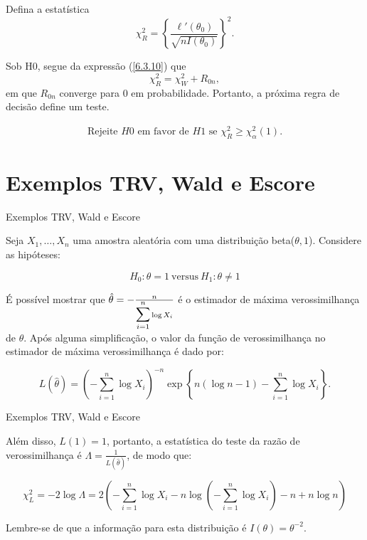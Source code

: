 \documentclass[12pt]{beamer}
\begin{document}
\begin{frame}{}
\begin{block}{}
\justifying
Defina a estatística
\[
\chi^2_R = \left\{\frac{\ell'(\theta_{0})}{\sqrt{nI(\theta_0)}}\right\}^2. 
\]

Sob H0, segue da expressão (\ref{6.3.10}) que
\[
\chi^2_R = \chi^2_W + R_{0n},
\]
em que $R_{0n}$ converge para $0$ em probabilidade. Portanto, a próxima regra de decisão define um teste.
\end{block}
\pause
\begin{block}{}
\justifying
\begin{align}\label{6.3.20}
    \text{Rejeite } H0 \text{ em favor de } H1 \text{ se } \chi^2_R \geq \chi^2_\alpha(1).
\end{align}
\end{block}
\end{frame}

\section{Exemplos TRV, Wald e Escore}
\begin{frame}{Exemplos TRV, Wald e Escore}
\begin{block}{}
\justifying
Seja \(X_1, \ldots, X_n\) uma amostra aleatória com uma distribuição beta(\(\theta, 1\)). Considere as hipóteses: 

$$H_0: \theta = 1~ \text{versus}~ H_1: \theta \neq 1$$
\end{block}
\pause
\begin{block}{}
\justifying
É possível mostrar que \(\hat{\theta} = -\frac{n}{{\displaystyle \sum_{i=1}^{n}} \log X_i}\) é o estimador de máxima verossimilhança de \(\theta\). Após alguma simplificação, o valor da função de verossimilhança no estimador de máxima verossimilhança é dado por:

\[L(\hat{\theta}) = \left(- \sum_{i=1}^n \log X_i\right)^{-n}\exp\left\{n(\log n - 1) - \sum_{i=1}^n \log X_i\right\}.\] 
\end{block}
\end{frame}

\begin{frame}{Exemplos TRV, Wald e Escore}
\begin{block}{}
\justifying
Além disso, \(L(1) = 1\), portanto, a estatística do teste da razão de verossimilhança é \(\Lambda = \frac{1}{L(\hat{\theta})}\), de modo que:

{\small
\[\chi^2_L = -2 \log \Lambda = 2\left(- \sum_{i=1}^n \log X_i - n \log\left(-\sum_{i=1}^n \log X_i\right) - n + n \log n\right)\]
}

Lembre-se de que a informação para esta distribuição é \(I(\theta) = \theta^{-2}\). 
\end{block}
\end{frame}
\end{document}
